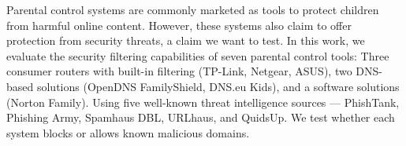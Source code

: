 Parental control systems are commonly marketed as tools to protect children from harmful online content. 
However, these systems also claim to offer protection from security threats, a claim we want to test. 
In this work, we evaluate the security filtering capabilities of seven parental control tools: Three consumer routers with built-in filtering (TP-Link, Netgear, ASUS), two DNS-based solutions (OpenDNS FamilyShield, DNS.eu Kids), and a software solutions (Norton Family). 
Using five well-known threat intelligence sources — PhishTank, Phishing Army, Spamhaus DBL, URLhaus, and QuidsUp.
We test whether each system blocks or allows known malicious domains. 
